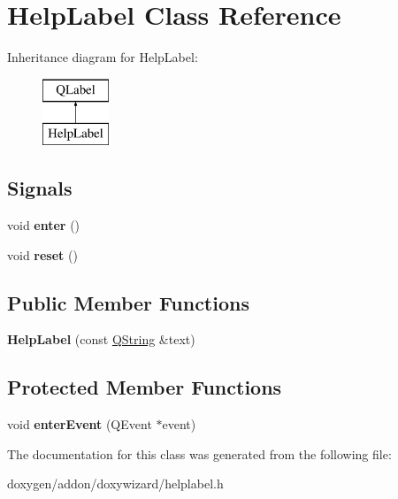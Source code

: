 \hypertarget{class_help_label}{}\section{Help\+Label Class Reference}
\label{class_help_label}
Inheritance diagram for Help\+Label\+:\begin{figure}[H]
\begin{center}
\leavevmode
\includegraphics[height=2.000000cm]{class_help_label}
\end{center}
\end{figure}
\subsection*{Signals}
\begin{DoxyCompactItemize}
\item 
\mbox{\label{class_help_label_a0440696e3a2e2eb57655595c49f0515e}} 
void {\bfseries enter} ()
\item 
\mbox{\label{class_help_label_a9a099d149d6189ed6f0f024893915216}} 
void {\bfseries reset} ()
\end{DoxyCompactItemize}
\subsection*{Public Member Functions}
\begin{DoxyCompactItemize}
\item 
\mbox{\label{class_help_label_af2e77b1563c15c02a21ba70670818d88}} 
{\bfseries Help\+Label} (const \mbox{\hyperlink{class_q_string}{Q\+String}} \&text)
\end{DoxyCompactItemize}
\subsection*{Protected Member Functions}
\begin{DoxyCompactItemize}
\item 
\mbox{\label{class_help_label_aa5519710ec361b4f9202c04398e814b8}} 
void {\bfseries enter\+Event} (Q\+Event $\ast$event)
\end{DoxyCompactItemize}


The documentation for this class was generated from the following file\+:\begin{DoxyCompactItemize}
\item 
doxygen/addon/doxywizard/helplabel.\+h\end{DoxyCompactItemize}
